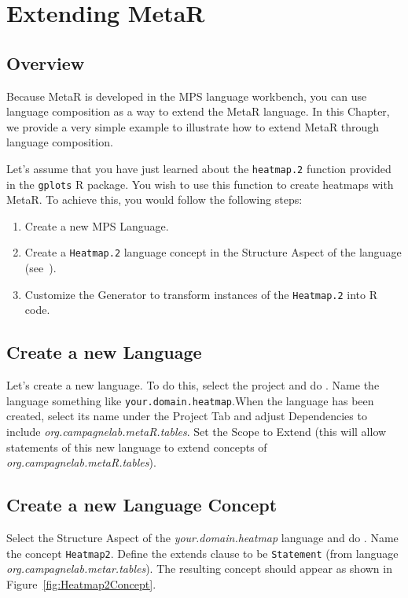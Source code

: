 


\chapter{Extending MetaR}\label{chap:ExtendingMetaR}

\section{Overview}
Because MetaR is developed in the MPS language workbench, you can use language composition as a way to extend the MetaR language. In this Chapter, we provide a very simple example to illustrate how to extend MetaR through language composition. 

Let's assume that you have just learned about the \texttt{heatmap.2} function provided in the \texttt{gplots} R package. You wish to use this function to create heatmaps with MetaR. To achieve this, you would follow the following steps: 
\begin{enumerate}
\item Create a new MPS Language.
  \item Create a \texttt{Heatmap.2} language concept in the Structure Aspect of the language (see~\cite{campagne2014mps}).
  \item Customize the Generator to transform instances of the \texttt{Heatmap.2} into R code.
\end{enumerate}

\section{Create a new Language}
Let's create a new language. To do this, select the project and do . Name the language something like \texttt{your.domain.\allowbreak{}heatmap}.When the language has been created, select its name under the Project Tab and adjust Dependencies to include \textit{org.campagnelab.metaR.tables}. Set the Scope to Extend (this will allow statements of this new language to extend concepts of \textit{org.campagnelab.metaR.tables}). 

\section{Create a new Language Concept}
Select the Structure Aspect of the \textit{your.domain.\allowbreak{}heatmap} language and do . Name the concept \texttt{Heatmap2}. Define the extends clause to be \texttt{Statement} (from language \textit{org.campagnelab.metar.tables}). The resulting concept should appear as shown in Figure~\ref{fig:Heatmap2Concept}.

